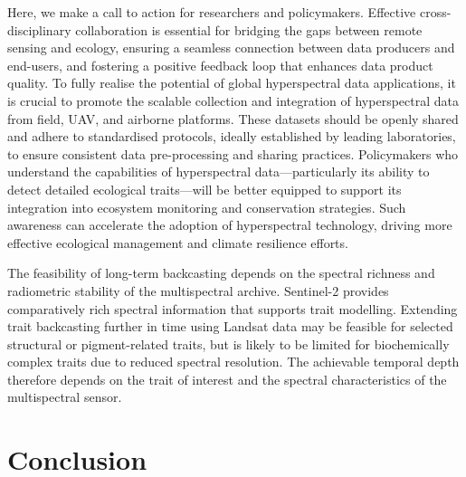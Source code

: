\documentclass[pdflatex,sn-mathphys-num]{sn-jnl}%
\theoremstyle{thmstyleone}%
\theoremstyle{thmstyletwo}%
\theoremstyle{thmstylethree}%
\begin{document}
Here, we make a call to action for researchers and policymakers. Effective cross-disciplinary collaboration is essential for bridging the gaps between remote sensing and ecology, ensuring a seamless connection between data producers and end-users, and fostering a positive feedback loop that enhances data product quality. To fully realise the potential of global hyperspectral data applications, it is crucial to promote the scalable collection and integration of hyperspectral data from field, UAV, and airborne platforms. These datasets should be openly shared and adhere to standardised protocols, ideally established by leading laboratories, to ensure consistent data pre-processing and sharing practices. Policymakers who understand the capabilities of hyperspectral data—particularly its ability to detect detailed ecological traits—will be better equipped to support its integration into ecosystem monitoring and conservation strategies. Such awareness can accelerate the adoption of hyperspectral technology, driving more effective ecological management and climate resilience efforts.

The feasibility of long-term backcasting depends on the spectral richness and radiometric stability of the multispectral archive. Sentinel-2 provides comparatively rich spectral information that supports trait modelling. Extending trait backcasting further in time using Landsat data may be feasible for selected structural or pigment-related traits, but is likely to be limited for biochemically complex traits due to reduced spectral resolution. The achievable temporal depth therefore depends on the trait of interest and the spectral characteristics of the multispectral sensor.



\section{Conclusion}\label{subsec5}
\end{document}

